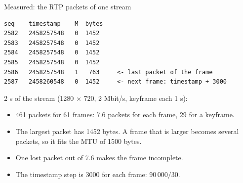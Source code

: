\begin{frame}[fragile]{Measured: the RTP packets of one stream}
\begin{lstlisting}[style=shell, basicstyle=\ttfamily\scriptsize]
seq    timestamp    M  bytes
2582   2458257548   0  1452
2583   2458257548   0  1452
2584   2458257548   0  1452
2585   2458257548   0  1452
2586   2458257548   1   763     <- last packet of the frame
2587   2458260548   0  1452     <- next frame: timestamp + 3000
\end{lstlisting}
  \small
  2 s of the stream (1280 $\times$ 720, 2 Mbit/s, keyframe each 1 s):
  \begin{itemize}
    \item 461 packets for 61 frames: 7.6 packets for each frame, 29 for a
          keyframe.
    \item The largest packet has 1452 bytes. A frame that is larger
          becomes several packets, so it fits the MTU of 1500 bytes.
    \item One lost packet out of 7.6 makes the frame incomplete.
    \item The timestamp step is 3000 for each frame: $90\,000 / 30$.
  \end{itemize}
\end{frame}

